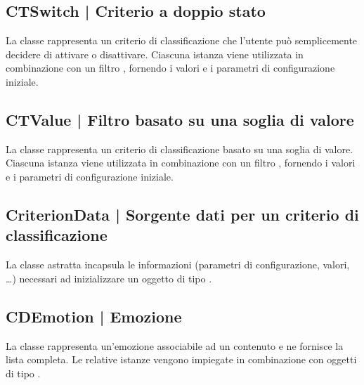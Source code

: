 \documentclass[10pt,a4paper,headinclude,footinclude,hidelinks]{scrreprt} %
\begin{document}
	\subsection[CTSwitch]{CTSwitch | Criterio a doppio stato}
	\label{sec:stage:design:sistema:model.criteria:switch-criterion}
	La classe \textit{} rappresenta un criterio di classificazione che l'utente può semplicemente decidere di attivare o disattivare. Ciascuna istanza viene utilizzata in combinazione con un filtro \textit{}, fornendo i valori e i parametri di configurazione iniziale.

	\subsection[CTValue]{CTValue | Filtro basato su una soglia di valore}
	\label{sec:stage:design:sistema:model.criteria:value-criterion}
	La classe \textit{} rappresenta un criterio di classificazione basato su una soglia di valore. Ciascuna istanza viene utilizzata in combinazione con un filtro \textit{}, fornendo i valori e i parametri di configurazione iniziale.

	\subsection[CriterionData]{CriterionData | Sorgente dati per un criterio di classificazione}
	\label{sec:stage:design:sistema:model.criteria:criterion-data}
	La classe astratta \textit{} incapsula le informazioni (parametri di configurazione, valori, \ldots) necessari ad inizializzare un oggetto di tipo \textit{}.

	\subsection[CDEmotion]{CDEmotion | Emozione}
	\label{sec:stage:design:sistema:model.criteria:emotion}
	La classe rappresenta un'emozione associabile ad un contenuto e ne fornisce la lista completa. Le relative istanze vengono impiegate in combinazione con oggetti di tipo \textit{}.
\end{document}
